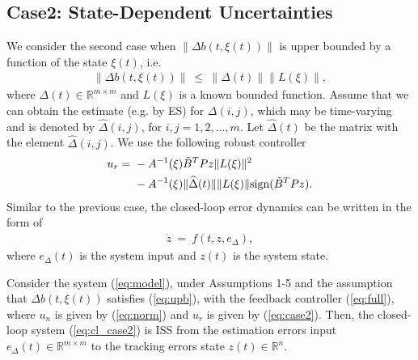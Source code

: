 \documentclass[twoside,leqno,onecolumn]{article}
\begin{document}
\subsection{Case2: State-Dependent Uncertainties}
\label{sec:case2} We consider the second case when $\|\Delta b
(t,\xi(t))\|$ is upper bounded by a function of the state
$\xi(t)$, i.e.
\begin{align}
\label{eq:upb} \|\Delta
b(t,\xi(t))\|~\leq~\|\Delta(t)\|\|L(\xi)\|,
\end{align}
where $\Delta(t)\in\mathbb{R}^{m\times m}$ and $L(\xi)$ is a known
bounded function. Assume that we can obtain the estimate (e.g. by
ES) for $\Delta(i,j)$, which may be time-varying and is denoted by
$\widehat{\Delta}(i,j)$, for $i,j = 1,2,\dots,m$. Let
$\widehat{\Delta}(t)$
be the matrix with the element $\widehat{\Delta}(i,j)$.
We use the following robust controller
\begin{align}
\label{eq:case2}
u_{r}=&~-A^{-1}(\xi)\tilde B ^TP z\|L(\xi)\|^2 \notag\\
&~-A^{-1}(\xi) \|\widehat{\Delta}(t)\|\|L(\xi)\|{\rm{sign} }
(\tilde B ^TP z).
\end{align}
Similar to the previous case, the closed-loop error dynamics can
be written in the form of
\begin{align}
\label{eq:cl_case2} \dot{z}~=~f(t,z,e_\Delta),
\end{align}
where $e_\Delta(t)$ is the system input and $z(t)$ is the system
state.



\begin{theorem}
\label{thm:case2}
Consider the system (\ref{eq:model}), under Assumptions 1-5 and
the assumption that $\Delta b(t,\xi(t))$ satisfies (\ref{eq:upb}),
with the feedback controller (\ref{eq:full}), where $u_n$ is given
by (\ref{eq:norm}) and $u_r$ is given by (\ref{eq:case2}). Then,
the closed-loop system (\ref{eq:cl_case2}) is ISS from the
estimation errors input $e_\Delta(t)\in\mathbb{R}^{m\times m}$ to
the tracking errors state $z(t)\in\mathbb{R}^n$.
\end{theorem}
\end{document}
